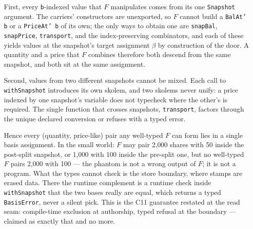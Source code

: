 First, every \texttt{b}-indexed value that $F$ manipulates comes from its one
\texttt{Snapshot} argument. The carriers' constructors are unexported, so $F$
cannot build a \texttt{BalAt' b} or a \texttt{PriceAt' b} of its own; the only
ways to obtain one are \texttt{snapBal}, \texttt{snapPrice},
\texttt{transport}, and the index-preserving combinators, and each of these
yields values at the snapshot's target assignment $\beta$ by construction of
the door. A quantity and a price that $F$ combines therefore both descend from
the same snapshot, and both sit at the same assignment.

Second, values from two different snapshots cannot be mixed. Each call to
\texttt{withSnapshot} introduces its own skolem, and two skolems never unify: a
price indexed by one snapshot's variable does not typecheck where the other's
is required. The single function that crosses snapshots, \texttt{transport},
factors through the unique declared conversion or refuses with a typed error.

Hence every (quantity, price-like) pair any well-typed $F$ can form lies in a
single basis assignment. In the small world: $F$ may pair 2,000 shares with 50
inside the post-split snapshot, or 1,000 with 100 inside the pre-split one, but
no well-typed $F$ pairs 2,000 with 100 --- the  phantom is not
a wrong output of $F$; it is not a program. What the types cannot check is the
store boundary, where stamps are erased data. There the runtime complement is
a runtime check inside \texttt{withSnapshot} that the two bases really are equal, which returns a typed
\texttt{BasisError}, never a silent pick. This is the C11 guarantee restated at
the read seam: compile-time exclusion at authorship, typed refusal at the
boundary --- claimed as exactly that and no more.

